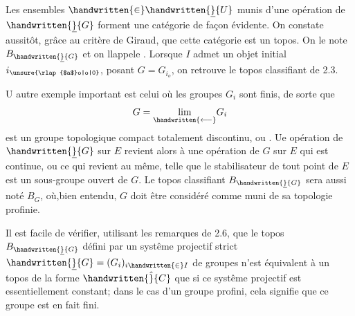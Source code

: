 Les ensembles $\handwritten{\in}\handwritten{\underline}{U}$ munis d'une opération de $\handwritten{\underline}{G}$ forment une catégorie de façon évidente. On constate aussitôt, grâce au critère de Giraud, que cette catégorie est un topos. On le note $B_{\handwritten{\underline}{G}}$ et on llappele . Lorsque $I$ admet un objet  initial $i_{\unsure{\rlap{$a$}o|o|0}}$, posant $G=G_{i_o}$, on retrouve le topos classifiant de 2.3.

 U autre exemple important est celui où les groupes $G_i$ sont finis, de sorte que
\[
G=\underset{\handwritten{\longleftarrow}}{\lim}G_i
\]
est un groupe topologique compact totalement discontinu, ou . Ue opération de $\handwritten{\underline}{G}$ sur $E$ revient alors à une opération de $G$ sur $E$ qui est continue, ou ce qui revient au même, telle que le stabilisateur de tout point de $E$ est un sous-groupe ouvert de $G$. Le topos classifiant $B_{\handwritten{\underline}{G}}$ sera aussi noté $B_G$, où,bien entendu, $G$ doit être considéré comme muni de sa topologie profinie.

 Il est facile de vérifier, utilisant les remarques de 2.6, que le topos $B_{\handwritten{\underline}{G}}$ défini par un systême projectif strict  $\handwritten{\underline}{G}=(G_i)_{i\handwritten{\in}I}$ de groupes n'est équivalent à un topos de la forme $\handwritten{\hat}{C}$ que si ce systême projectif est essentiellement constant; dans le cas d'un groupe profini, cela signifie que ce groupe est en fait fini.


